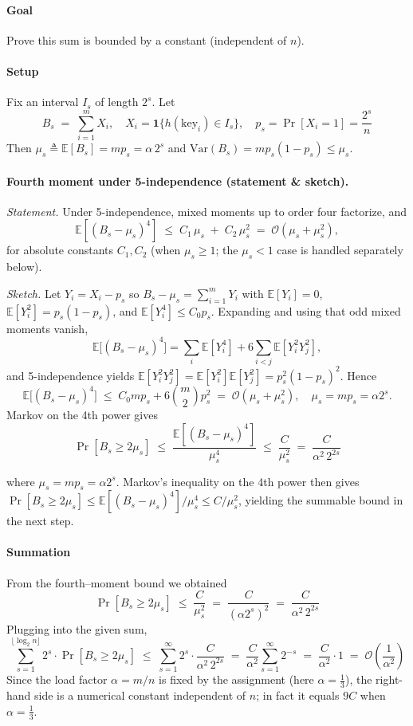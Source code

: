 \documentclass[11pt]{article}
\begin{document}
\paragraph{Goal} Prove this sum is bounded by a constant (independent of \(n\)).

\paragraph{Setup} Fix an interval \(I_s\) of length \(2^s\). Let
\[
  B_s \;=\; \sum_{i=1}^m X_i,\quad X_i=\mathbf{1}\{h(\text{key}_i)\in I_s\},\quad
  p_s=\Pr[X_i=1]=\frac{2^s}{n}
\]
Then \(\mu_s \triangleq \mathbb{E}[B_s]=m p_s=\alpha\, 2^s\) and \(\mathrm{Var}(B_s)=m p_s(1-p_s)\le \mu_s\).

\paragraph{Fourth moment under 5-independence (statement \& sketch).}
\emph{Statement.} Under 5-independence, mixed moments up to order four factorize, and
\[
\mathbb{E}\!\left[(B_s-\mu_s)^4\right] \;\le\; C_1\,\mu_s \;+\; C_2\,\mu_s^2
\;=\; \mathcal{O}(\mu_s+\mu_s^2),
\]
for absolute constants $C_1,C_2$ (when $\mu_s\ge 1$; the $\mu_s<1$ case is handled separately below).

\emph{Sketch.} Let $Y_i=X_i-p_s$ so $B_s-\mu_s=\sum_{i=1}^m Y_i$ with
$\mathbb{E}[Y_i]=0$, $\mathbb{E}[Y_i^2]=p_s(1-p_s)$, and $\mathbb{E}[Y_i^4]\le C_0 p_s$.
Expanding and using that odd mixed moments vanish,
\[
\mathbb{E}\big[(B_s-\mu_s)^4\big]
= \sum_i \mathbb{E}[Y_i^4] + 6\!\!\sum_{i<j}\! \mathbb{E}[Y_i^2 Y_j^2],
\]
and 5-independence yields $\mathbb{E}[Y_i^2 Y_j^2]=\mathbb{E}[Y_i^2]\mathbb{E}[Y_j^2]=p_s^2(1-p_s)^2$.
Hence
\[
\mathbb{E}\big[(B_s-\mu_s)^4\big] \;\le\; C_0 m p_s + 6\binom{m}{2}p_s^2
\;=\; \mathcal{O}(\mu_s+\mu_s^2),\quad \mu_s=mp_s=\alpha 2^s.
\]
Markov on the 4th power gives
\[
\Pr[B_s\ge 2\mu_s] \;\le\; \frac{\mathbb{E}[(B_s-\mu_s)^4]}{\mu_s^4}
\;\le\; \frac{C}{\mu_s^2} \;=\; \frac{C}{\alpha^2\,2^{2s}}
\]



where \(\mu_s=m p_s=\alpha 2^s\). Markov’s inequality on the 4th power then gives
\(\Pr[B_s\!\ge 2\mu_s]\le \mathbb{E}[(B_s-\mu_s)^4]/\mu_s^4 \le C/\mu_s^2\),
yielding the summable bound in the next step.


\paragraph{Summation}
From the fourth–moment bound we obtained
\[
\Pr[B_s \ge 2\mu_s] \;\le\; \frac{C}{\mu_s^2}
\;=\; \frac{C}{(\alpha 2^s)^2}
\;=\; \frac{C}{\alpha^2\,2^{2s}}
\]
Plugging into the given sum,
\[
\sum_{s=1}^{\lfloor\log_2 n\rfloor} 2^s \cdot \Pr[B_s \ge 2\mu_s]
\;\le\; \sum_{s=1}^{\infty} 2^s \cdot \frac{C}{\alpha^2\,2^{2s}}
\;=\; \frac{C}{\alpha^2}\sum_{s=1}^{\infty} 2^{-s}
\;=\; \frac{C}{\alpha^2}\cdot 1
\;=\; \mathcal{O}\!\left(\frac{1}{\alpha^2}\right)
\]
Since the load factor $\alpha=m/n$ is fixed by the assignment (here $\alpha=\tfrac13$), the right-hand side is a numerical constant independent of $n$; in fact it equals $9C$ when $\alpha=\tfrac13$. \newline
\end{document}
